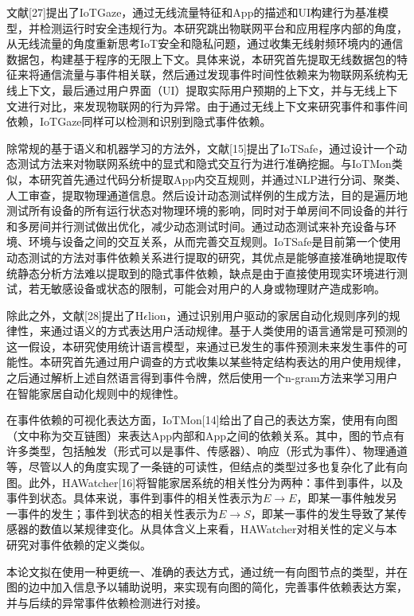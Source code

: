 文献[27]提出了IoTGaze，通过无线流量特征和App的描述和UI构建行为基准模型，并检测运行时安全违规行为。本研究跳出物联网平台和应用程序内部的角度，从无线流量的角度重新思考IoT安全和隐私问题，通过收集无线射频环境内的通信数据包，构建基于程序的无限上下文。具体来说，本研究首先提取无线数据包的特征来将通信流量与事件相关联，然后通过发现事件时间性依赖来为物联网系统构无线上下文，最后通过用户界面（UI）提取实际用户预期的上下文，并与无线上下文进行对比，来发现物联网的行为异常。由于通过无线上下文来研究事件和事件间依赖，IoTGaze同样可以检测和识别到隐式事件依赖。

除常规的基于语义和机器学习的方法外，文献[15]提出了IoTSafe，通过设计一个动态测试方法来对物联网系统中的显式和隐式交互行为进行准确挖掘。与IoTMon类似，本研究首先通过代码分析提取App内交互规则，并通过NLP进行分词、聚类、人工审查，提取物理通道信息。然后设计动态测试样例的生成方法，目的是遍历地测试所有设备的所有运行状态对物理环境的影响，同时对于单房间不同设备的并行和多房间并行测试做出优化，减少动态测试时间。通过动态测试来补充设备与环境、环境与设备之间的交互关系，从而完善交互规则。IoTSafe是目前第一个使用动态测试的方法对事件依赖关系进行提取的研究，其优点是能够直接准确地提取传统静态分析方法难以提取到的隐式事件依赖，缺点是由于直接使用现实环境进行测试，若无敏感设备或状态的限制，可能会对用户的人身或物理财产造成影响。

除此之外，文献[28]提出了H$\epsilon$lion，通过识别用户驱动的家居自动化规则序列的规律性，来通过语义的方式表达用户活动规律。基于人类使用的语言通常是可预测的这一假设，本研究使用统计语言模型，来通过已发生的事件预测未来发生事件的可能性。本研究首先通过用户调查的方式收集以某些特定结构表达的用户使用规律，之后通过解析上述自然语言得到事件令牌，然后使用一个n-gram方法来学习用户在智能家居自动化规则中的规律性。

在事件依赖的可视化表达方面，IoTMon[14]给出了自己的表达方案，使用有向图（文中称为交互链图）来表达App内部和App之间的依赖关系。其中，图的节点有许多类型，包括触发（形式可以是事件、传感器）、响应（形式为事件）、物理通道等，尽管以人的角度实现了一条链的可读性，但结点的类型过多也复杂化了此有向图。此外，HAWatcher[16]将智能家居系统的相关性分为两种：事件到事件，以及事件到状态。具体来说，事件到事件的相关性表示为$E\rightarrow E$，即某一事件触发另一事件的发生；事件到状态的相关性表示为$E\rightarrow S$，即某一事件的发生导致了某传感器的数值以某规律变化。从具体含义上来看，HAWatcher对相关性的定义与本研究对事件依赖的定义类似。

本论文拟在使用一种更统一、准确的表达方式，通过统一有向图节点的类型，并在图的边中加入信息予以辅助说明，来实现有向图的简化，完善事件依赖表达方案，并与后续的异常事件依赖检测进行对接。

